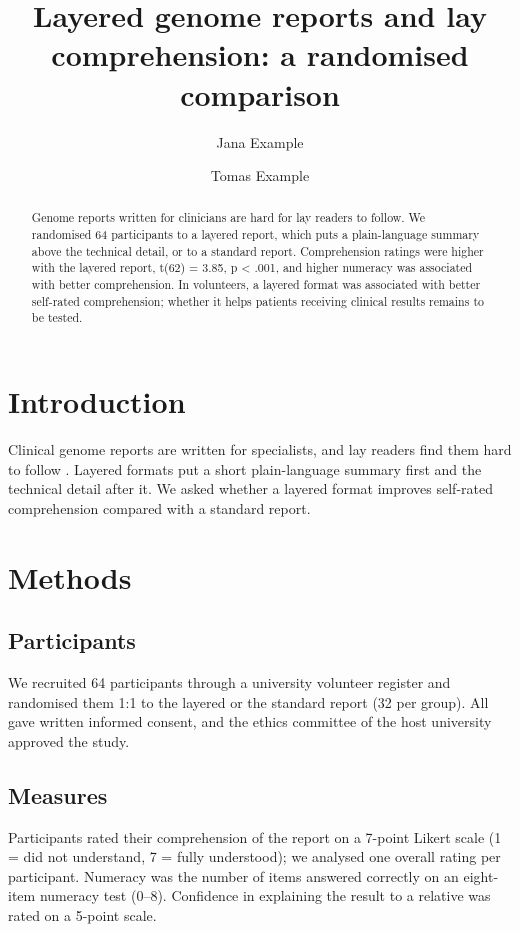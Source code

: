 \documentclass{article}
\title{Layered genome reports and lay comprehension: a randomised comparison}
\author{Jana Example \and Tomas Example}
\begin{document}
\maketitle

\begin{abstract}
Genome reports written for clinicians are hard for lay readers to follow. We randomised 64 participants
to a layered report, which puts a plain-language summary above the technical detail, or to a standard
report. Comprehension ratings were higher with the layered report, t(62) = 3.85, p < .001, and higher
numeracy was associated with better comprehension. In volunteers, a layered format was associated with
better self-rated comprehension; whether it helps patients receiving clinical results remains to be tested.
\end{abstract}

\section{Introduction}
Clinical genome reports are written for specialists, and lay readers find them hard to follow
\cite{haga2014,goehringer2018}. Layered formats put a short plain-language summary first and the
technical detail after it. We asked whether a layered format improves self-rated comprehension compared
with a standard report.

\section{Methods}
\subsection{Participants}
We recruited 64 participants through a university volunteer register and randomised them 1:1 to the
layered or the standard report (32 per group). All gave written informed consent, and the ethics
committee of the host university approved the study.

\subsection{Measures}
Participants rated their comprehension of the report on a 7-point Likert scale (1 = did not understand,
7 = fully understood); we analysed one overall rating per participant. Numeracy was the number of items
answered correctly on an eight-item numeracy test (0--8). Confidence in explaining the result to a
relative was rated on a 5-point scale.
\end{document}
